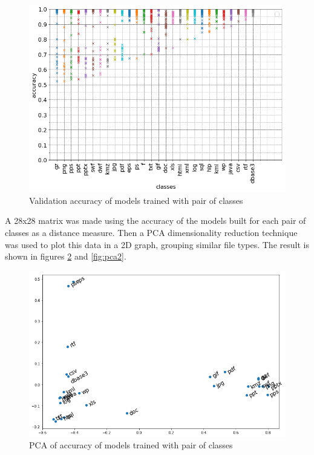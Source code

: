 \noindent
\begin{figure}[htb!]
\centering\includegraphics[width=1.0\textwidth]{content/dual.png}
\caption{\label{fig:dual}Validation accuracy of models trained with pair of classes}%
\end{figure}



A 28x28 matrix was made using the accuracy of the models built for each pair of classes as a distance measure. Then a PCA dimensionality reduction technique was used to plot this data in a 2D graph, grouping similar file types.
The result is shown in figures \ref{fig:pca} and \ref{fig:pca2}. 

\noindent
\begin{figure}[htb!]
\centering\includegraphics[width=1.0\textwidth]{content/pca.png}
\caption{\label{fig:pca}PCA of accuracy of models trained with pair of classes}%
\end{figure}


